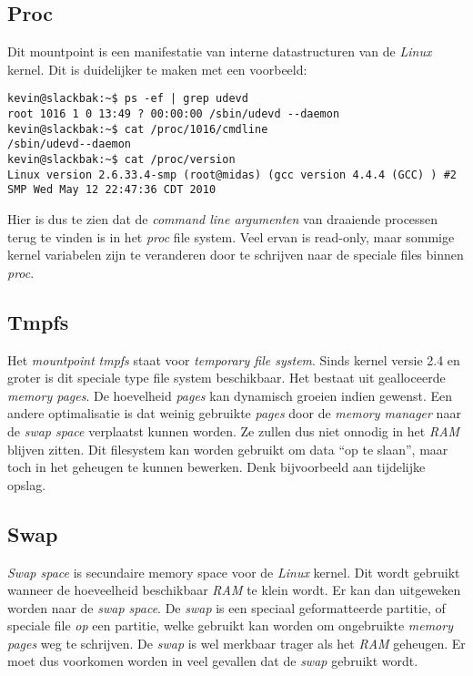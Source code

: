 \subsection{Proc}
Dit mountpoint is een manifestatie van interne datastructuren van de \emph{Linux} kernel. Dit is duidelijker te maken met een voorbeeld:
\begin{lstlisting}
kevin@slackbak:~$ ps -ef | grep udevd
root 1016 1 0 13:49 ? 00:00:00 /sbin/udevd --daemon
kevin@slackbak:~$ cat /proc/1016/cmdline 
/sbin/udevd--daemon
kevin@slackbak:~$ cat /proc/version 
Linux version 2.6.33.4-smp (root@midas) (gcc version 4.4.4 (GCC) ) #2 SMP Wed May 12 22:47:36 CDT 2010
\end{lstlisting}%
Hier is dus te zien dat de \emph{command line argumenten} van draaiende processen terug te vinden is in het \emph{proc} file system. Veel ervan is read-only, maar sommige kernel variabelen zijn te veranderen door te schrijven naar de speciale files binnen \emph{proc}.

\subsection{Tmpfs}
Het \emph{mountpoint} \emph{tmpfs} staat voor \emph{temporary file system}. Sinds kernel versie 2.4 en groter is dit speciale type file system beschikbaar. Het bestaat uit gealloceerde \emph{memory pages}. De hoevelheid \emph{pages} kan dynamisch groeien indien gewenst. Een andere optimalisatie is dat weinig gebruikte \emph{pages} door de \emph{memory manager} naar de \emph{swap space} verplaatst kunnen worden. Ze zullen dus niet onnodig in het \emph{RAM} blijven zitten. Dit filesystem kan worden gebruikt om data ``op te slaan'', maar toch in het geheugen te kunnen bewerken. Denk bijvoorbeeld aan tijdelijke opslag. 

\subsection{Swap}
\emph{Swap space} is secundaire memory space voor de \emph{Linux} kernel. Dit wordt gebruikt wanneer de hoeveelheid beschikbaar \emph{RAM} te klein wordt. Er kan dan uitgeweken worden naar de \emph{swap space}. De \emph{swap} is een speciaal geformatteerde partitie, of speciale file \emph{op} een partitie, welke gebruikt kan worden om ongebruikte \emph{memory pages} weg te schrijven. De \emph{swap} is wel merkbaar trager als het \emph{RAM} geheugen. Er moet dus voorkomen worden in veel gevallen dat de \emph{swap} gebruikt wordt.

